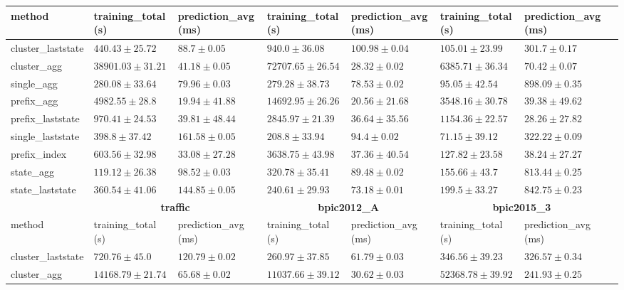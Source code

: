 \documentclass[twoside,11pt]{Latex/Classes/PhDthesisPSnPDF}
\begin{document}
\begin{table}[h]
{\begin{tabular}{llllllll}
			method  & training\_total (s) & prediction\_avg (ms) & training\_total (s) & prediction\_avg (ms) & training\_total (s) & prediction\_avg (ms) \\ \midrule
			cluster\_laststate & $440.43 \pm 25.72$ & $88.7 \pm 0.05$ & $940.0 \pm 36.08$ & $100.98 \pm 0.04$ & $105.01 \pm 23.99$ & $301.7 \pm 0.17$ \\ 
			cluster\_agg & $38901.03 \pm 31.21$ & $41.18 \pm 0.05$ & $72707.65 \pm 26.54$ & $28.32 \pm 0.02$ & $6385.71 \pm 36.34$ & $70.42 \pm 0.07$ \\ 
			single\_agg & $280.08 \pm 33.64$ & $79.96 \pm 0.03$ & $279.28 \pm 38.73$ & $78.53 \pm 0.02$ & $95.05 \pm 42.54$ & $898.09 \pm 0.35$ \\ 
			prefix\_agg & $4982.55 \pm 28.8$ & $\mathbf{19.94 \pm 41.88}$ & $14692.95 \pm 26.26$ & $\mathbf{20.56 \pm 21.68}$ & $3548.16 \pm 30.78$ & $39.38 \pm 49.62$ \\ 
			prefix\_laststate & $970.41 \pm 24.53$ & $39.81 \pm 48.44$ & $2845.97 \pm 21.39$ & $36.64 \pm 35.56$ & $1154.36 \pm 22.57$ & $\mathbf{28.26 \pm 27.82}$ \\ 
			single\_laststate & $398.8 \pm 37.42$ & $161.58 \pm 0.05$ & $208.8 \pm 33.94$ & $94.4 \pm 0.02$ & $\mathbf{71.15 \pm 39.12}$ & $322.22 \pm 0.09$ \\ 
			prefix\_index & $603.56 \pm 32.98$ & $33.08 \pm 27.28$ & $3638.75 \pm 43.98$ & $37.36 \pm 40.54$ & $127.82 \pm 23.58$ & $38.24 \pm 27.27$ \\ 
			state\_agg & $\mathbf{119.12 \pm 26.38}$ & $98.52 \pm 0.03$ & $320.78 \pm 35.41$ & $89.48 \pm 0.02$ & $155.66 \pm 43.7$ & $813.44 \pm 0.25$ \\ 
			state\_laststate & $360.54 \pm 41.06$ & $144.85 \pm 0.05$ & $\mathbf{240.61 \pm 29.93}$ & $73.18 \pm 0.01$ & $199.5 \pm 33.27$ & $842.75 \pm 0.23$ \\ 
			\bottomrule
			\toprule
			& \multicolumn{2}{c}{{\bfseries traffic}} & \multicolumn{2}{c}{{\bfseries bpic2012\_A}} & \multicolumn{2}{c}{{\bfseries bpic2015\_3}} \\ \cmidrule(lr){2-3} \cmidrule(lr){4-5} \cmidrule(lr){6-7}
			method  & training\_total (s) & prediction\_avg (ms) & training\_total (s) & prediction\_avg (ms) & training\_total (s) & prediction\_avg (ms) \\ \midrule
			cluster\_laststate & $720.76 \pm 45.0$ & $120.79 \pm 0.02$ & $260.97 \pm 37.85$ & $61.79 \pm 0.03$ & $346.56 \pm 39.23$ & $326.57 \pm 0.34$ \\ 
			cluster\_agg & $14168.79 \pm 21.74$ & $65.68 \pm 0.02$ & $11037.66 \pm 39.12$ & $\mathbf{30.62 \pm 0.03}$ & $52368.78 \pm 39.92$ & $241.93 \pm 0.25$ \\ 

\end{tabular}}
\end{table}
\end{document}

